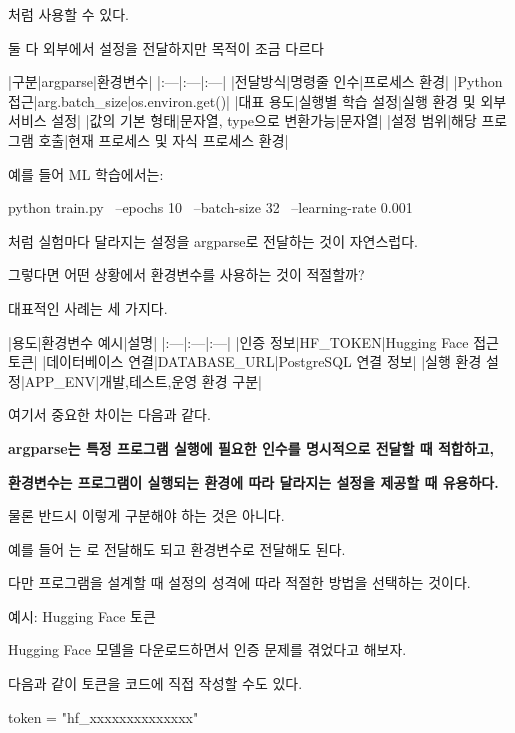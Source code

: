 처럼 사용할 수 있다.

둘 다 외부에서 설정을 전달하지만 목적이 조금 다르다

\begin{dhktable}
|구분|argparse|환경변수|
|:---|:---|:---|
|전달방식|명령줄 인수|프로세스 환경|
|Python 접근|arg.batch_size|os.environ.get()|
|대표 용도|실행별 학습 설정|실행 환경 및 외부 서비스 설정|
|값의 기본 형태|문자열, type으로 변환가능|문자열|
|설정 범위|해당 프로그램 호출|현재 프로세스 및 자식 프로세스 환경|
\end{dhktable}

예를 들어 ML 학습에서는:

\begin{dhkzsh}
python train.py \
    --epochs 10 \
    --batch-size 32 \
    --learning-rate 0.001
\end{dhkzsh}

처럼 실험마다 달라지는 설정을 argparse로 전달하는 것이 자연스럽다.

그렇다면 어떤 상황에서 환경변수를 사용하는 것이 적절할까?

대표적인 사례는 세 가지다.

\begin{dhktable}
|용도|환경변수 예시|설명|
|:---|:---|:---|
|인증 정보|HF_TOKEN|Hugging Face 접근 토큰|
|데이터베이스 연결|DATABASE_URL|PostgreSQL 연결 정보|
|실행 환경 설정|APP_ENV|개발,테스트,운영 환경 구분|
\end{dhktable}

여기서 중요한 차이는 다음과 같다.

\textbf{argparse는 특정 프로그램 실행에 필요한 인수를 명시적으로 전달할 때 적합하고,}

\textbf{환경변수는 프로그램이 실행되는 환경에 따라 달라지는 설정을 제공할 때 유용하다.}

물론 반드시 이렇게 구분해야 하는 것은 아니다.

예를 들어 는 로 전달해도 되고 환경변수로 전달해도 된다.

다만 프로그램을 설계할 때 설정의 성격에 따라 적절한 방법을 선택하는 것이다.

예시: Hugging Face 토큰

Hugging Face 모델을 다운로드하면서 인증 문제를 겪었다고 해보자.

다음과 같이 토큰을 코드에 직접 작성할 수도 있다.

\begin{dhkzsh}
token = "hf_xxxxxxxxxxxxxx"
\end{dhkzsh}

